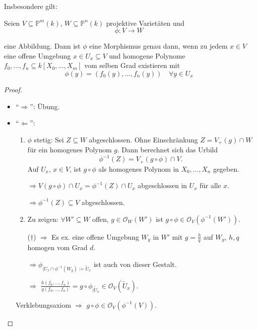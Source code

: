 Insbesondere gilt:
\begin{prop}[orig. 56]
  \label{prop:charakterisierung-morphismen-proj-varietaeten}
  Seien $V\subseteq\mathbb{P}^{m}(k)$, $W\subseteq\mathbb{P}^{n}(k)$
  projektive Varietäten und
  \[
    \phi: V \longrightarrow W
  \]

  eine Abbildung. Dann ist $\phi$ eine Morphismus genau dann, wenn
  zu jedem $x\in V$ eine offene Umgebung $x\in U_{x}\subseteq V$ und
  homogene Polynome $f_{0},\ldots,f_{n}\subseteq k[X_{0},\ldots,X_{m}]$
  vom selben Grad existieren mit
  \[
    \phi(y)=(f_{0}(y),\ldots,f_{n}(y))\quad\forall y\in U_{x}
  \]
\end{prop}
\begin{proof}
  \mbox{}
  \begin{itemize}
  \item ``$\Rightarrow$'': Übung.
  \item ``$\Leftarrow$'':
    \begin{enumerate}
    \item $\phi$ stetig: Sei $Z\subseteq W$ abgeschlossen. Ohne Einschränkung
      $Z=V_{+}(g)\cap W$ für ein homogenes Polynom $g$. Dann berechnet
      sich das Urbild
      \[
        \phi^{-1}(Z)=V_{+}(g\circ\phi)\cap V.
      \]
      Auf $U_{x}$, $x\in V$, ist $g\circ\phi$ als homogenes Polynom in
      $X_{0},\ldots,X_{n}$ gegeben. 

      $\Rightarrow V(g\circ\phi)\cap U_{x}=\phi^{-1}(Z)\cap U_{x}$ abgeschlossen
      in $U_{x}$ für alle $x$.

      $\Rightarrow\phi^{-1}(Z)\subseteq V$ abgeschlossen.
    \item Zu zeigen: $\forall W'\subseteq W$ offen, $g\in\mathcal{O}_{W}(W')$
      ist $g\circ\phi\in\mathcal{O}_{V}(\phi^{-1}(W'))$.

      ($\dagger$) $\Rightarrow$ Es ex. eine offene Umgebung $W_{y}$ in $W'$
      mit $g=\frac{h}{q}$ auf $W_{y}$, $h,q$ homogen vom Grad $d$.

      $\Rightarrow\phi_{|U_{x}\cap\phi^{-1}(W_{y}):=\tilde{U}_{x}}$ ist
      auch von dieser Gestalt.

      $\Rightarrow$ $\frac{h(f_{0},\ldots,f_{n})}{q(f_{0},\ldots,f_{n})}=g\circ\phi_{|\tilde{U}_{x}}\in\mathcal{O}_{V}(\tilde{U}_{x})$.
    \end{enumerate}
    Verklebungsaxiom $\Rightarrow$ $g\circ\phi\in\mathcal{O}_{V}(\phi^{-1}(V))$.
  \end{itemize}
\end{proof}

